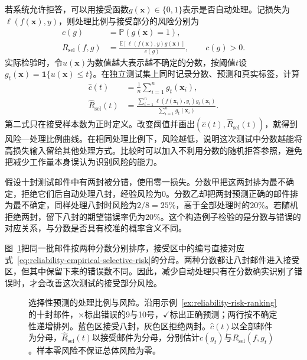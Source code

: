 若系统允许拒答，可以用接受函数$g(\bm{x})\in\{0,1\}$表示是否自动处理。记损失为$\ell(f(\bm{x}),y)$，则处理比例与接受部分的风险分别为
\begin{equation}
 \begin{aligned}
 c(g)&=\mathbb P(g(\bm{x})=1),\\
 R_{\mathrm{sel}}(f,g)
 &=\frac{\mathbb E[\ell(f(\bm{x}),y)g(\bm{x})]}
         {c(g)},\qquad c(g)>0.
 \end{aligned}
 \label{eq:reliability-selective-risk}
\end{equation}
实际检验时，令$u(\bm{x})$为数值越大表示越不确定的分数，按阈值$t$设$g_t(\bm{x})=\mathbf1\{u(\bm{x})\leq t\}$。在独立测试集上同时记录分数、预测和真实标签，计算
\begin{equation}
 \begin{aligned}
 \hat c(t)&=\frac1n\sum_{i=1}^{n}g_t(\bm{x}_i),\\
 \hat R_{\mathrm{sel}}(t)
 &=\frac{\sum_{i=1}^{n}\ell(f(\bm{x}_i),y_i)g_t(\bm{x}_i)}
          {\sum_{i=1}^{n}g_t(\bm{x}_i)}.
 \end{aligned}
 \label{eq:reliability-empirical-selective-risk}
\end{equation}
第二式只在接受样本数为正时定义。改变阈值并画出$(\hat c(t),\hat R_{\mathrm{sel}}(t))$，就得到风险—处理比例曲线。在相同处理比例下，风险越低，说明这次测试中分数越能将高损失输入留给其他处理方式。比较时可以加入不利用分数的随机拒答参照，避免把减少工作量本身误认为识别风险的能力。

\begin{example}[相同拒答比例下的不同效果]
\label{ex:reliability-risk-ranking}
假设十封测试邮件中有两封被分错，使用零一损失。分数甲把这两封排为最不确定，拒绝它们后自动处理八封，经验风险为0。分数乙却把两封预测正确的邮件排为最不确定，同样处理八封时风险为$2/8=25\%$，高于全部处理时的$20\%$。若随机拒绝两封，留下八封的期望错误率仍为$20\%$。这个构造例子检验的是分数与错误的对应关系，与分数是否具有校准的概率含义不同。
\end{example}

图~\ref{fig:trust-selective-risk-coverage}把同一批邮件按两种分数分别排序，接受区中的编号直接对应式~\eqref{eq:reliability-empirical-selective-risk}的分母。两种分数都让八封邮件进入接受区，但其中保留下来的错误数不同。因此，减少自动处理只有在分数确实识别了错误时，才会改善这次测试的接受部分风险。

\begin{figure}[!htb]
  \centering
  
  \caption{选择性预测的处理比例与风险。沿用示例~\ref{ex:reliability-risk-ranking}的十封邮件，$\times$标出错误的9与10号，$\checkmark$标出正确预测；两行按不确定性递增排列。蓝色区接受八封，灰色区拒绝两封。$\hat c(t)$以全部邮件为分母，$\hat R_{\mathrm{sel}}(t)$以接受邮件为分母，分别估计$c(g_t)$与$R_{\mathrm{sel}}(f,g_t)$。样本零风险不保证总体风险为零。}
  \label{fig:trust-selective-risk-coverage}
\end{figure}

